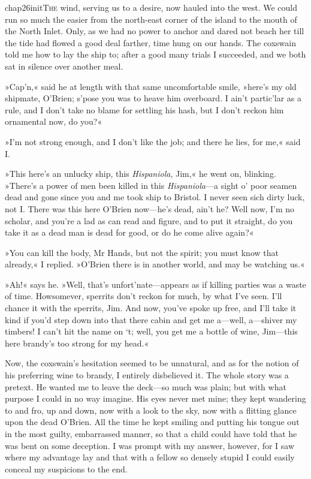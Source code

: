 
   \lettrine[lines=4,image=true]{chap26initT}{he} wind, serving us to a desire, now hauled into the west. We could run so much the easier from the north-east corner of the island to the mouth of the North Inlet. Only, as we had no power to anchor and dared not beach her till the tide had flowed a good deal farther, time hung on our hands. The coxswain told me how to lay the ship to; after a good many trials I succeeded, and we both sat in silence over another meal.

»Cap'n,« said he at length with that same uncomfortable smile, »here's my old shipmate, O'Brien; s'pose you was to heave him overboard. I ain't partic'lar as a rule, and I don't take no blame for settling his hash, but I don't reckon him ornamental now, do you?«

»I'm not strong enough, and I don't like the job; and there he lies, for me,« said I.

»This here's an unlucky ship, this \textit{Hispaniola}, Jim,« he went on, blinking. »There's a power of men been killed in this \textit{Hispaniola}—a sight o' poor seamen dead and gone since you and me took ship to Bristol. I never seen sich dirty luck, not I. There was this here O'Brien now—he's dead, ain't he? Well now, I'm no scholar, and you're a lad as can read and figure, and to put it straight, do you take it as a dead man is dead for good, or do he come alive again?«

»You can kill the body, Mr Hands, but not the spirit; you must know that already,« I replied. »O'Brien there is in another world, and may be watching us.«

»Ah!« says he. »Well, that's unfort'nate—appears as if killing parties was a waste of time. Howsomever, sperrits don't reckon for much, by what I've seen. I'll chance it with the sperrits, Jim. And now, you've spoke up free, and I'll take it kind if you'd step down into that there cabin and get me a—well, a—shiver my timbers! I can't hit the name on `t; well, you get me a bottle of wine, Jim—this here brandy's too strong for my head.«

Now, the coxswain's hesitation seemed to be unnatural, and as for the notion of his preferring wine to brandy, I entirely disbelieved it. The whole story was a pretext. He wanted me to leave the deck—so much was plain; but with what purpose I could in no way imagine. His eyes never met mine; they kept wandering to and fro, up and down, now with a look to the sky, now with a flitting glance upon the dead O'Brien. All the time he kept smiling and putting his tongue out in the most guilty, embarrassed manner, so that a child could have told that he was bent on some deception. I was prompt with my answer, however, for I saw where my advantage lay and that with a fellow so densely stupid I could easily conceal my suspicions to the end.


